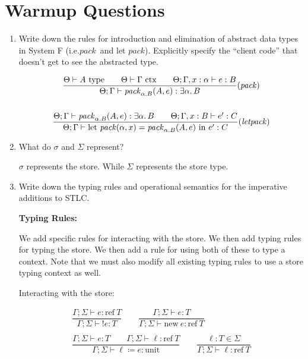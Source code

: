\documentclass[10pt,\jkfside,a4paper]{article}
\newcommand{\pack}{\ensuremath{\mathit{pack}}}
\newcommand{\letpack}{\ensuremath{\text{let}\ \mathit{pack}}}
\newcommand{\type}[1]{\ensuremath{#1\ \text{type}}}
\newcommand{\ctx}[1]{\ensuremath{#1\ \text{ctx}}}
\begin{document}
\section{Warmup Questions}

\begin{enumerate}

    \item Write down the rules for introduction and elimination of abstract data types in System F (i.e.\@ \pack\ and let \pack). Explicitly specify the ``client code'' that doesn't get to see the abstracted type.

    \begin{gather*}
        \dfrac{
            \Theta \vdash \type{A} \qquad \Theta \vdash \ctx{\Gamma} \qquad \Theta; \Gamma, x: \alpha \vdash e: B
        }{
            \Theta; \Gamma \vdash \pack_{\alpha.B}(A, e): \exists \alpha\ldotp B
        }(\pack) \\\\
        \dfrac{
            \Theta; \Gamma \vdash \pack_{\alpha.B}(A, e): \exists \alpha\ldotp B \qquad \Theta; \Gamma, x: B \vdash e': C
        }{
            \Theta; \Gamma \vdash \letpack(\alpha, x) = \pack_{\alpha.B}(A, e)\ \text{in}\ e': C
        }(\mathit{letpack})
    \end{gather*}

    \item What do $\sigma$ and $\Sigma$ represent?

    $\sigma$ represents the store. While $\Sigma$ represents the store type.

    \item Write down the typing rules and operational semantics for the imperative additions to STLC\@.

    \textbf{Typing Rules:}

    We add specific rules for interacting with the store. We then add typing rules for typing the store. We then add a rule for using both of these to type a context. Note that we must also modify all existing
    typing rules to use a store typing context as well.

    Interacting with the store:

    \begin{gather*}
        \dfrac{
            \Gamma; \Sigma \vdash e: \mathrm{ref}\ T
        }{
            \Gamma; \Sigma \vdash !e: T
        }
        \qquad
        \dfrac{
            \Gamma; \Sigma \vdash e: T
        }{
            \Gamma; \Sigma \vdash \mathrm{new}\ e: \mathrm{ref}\ T
        }
        \\\\
        \dfrac{
            \Gamma; \Sigma \vdash e: T \qquad \Gamma; \Sigma \vdash \ell: \mathrm{ref}\ T
        }{
            \Gamma; \Sigma \vdash \ell \coloneqq e: \mathrm{unit}
        }
        \qquad
        \dfrac{
            \ell: T \in \Sigma
        }{
            \Gamma; \Sigma \vdash \ell: \mathrm{ref}\ T
        }
    \end{gather*}


\end{enumerate}
\end{document}
